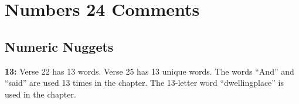 \section{Numbers 24 Comments}

\subsection{Numeric Nuggets}
\textbf{13: } Verse 22 has 13 words. Verse 25 has 13 unique words.  The words ``And'' and ``said'' are used 13 times in the chapter. The 13-letter word ``dwellingplace'' is used in the chapter.

